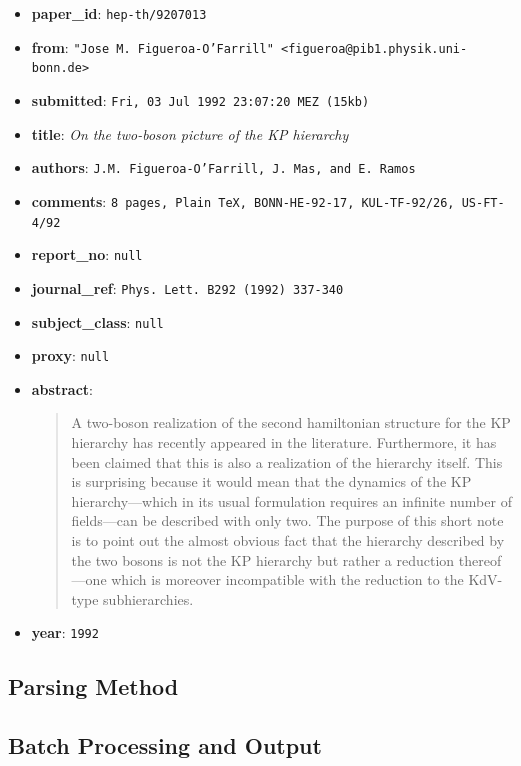 \documentclass[12pt]{article}
\begin{document}
\begin{itemize}
  \item \textbf{paper\_id}: \texttt{hep-th/9207013}
  \item \textbf{from}: \texttt{"Jose M. Figueroa-O'Farrill" <figueroa@pib1.physik.uni-bonn.de>}
  \item \textbf{submitted}: \texttt{Fri, 03 Jul 1992 23:07:20 MEZ (15kb)}
  \item \textbf{title}: \textit{On the two-boson picture of the KP hierarchy}
  \item \textbf{authors}: \texttt{J.M. Figueroa-O'Farrill, J. Mas, and E. Ramos}
  \item \textbf{comments}: \texttt{8 pages, Plain TeX, BONN-HE-92-17, KUL-TF-92/26, US-FT-4/92}
  \item \textbf{report\_no}: \texttt{null}
  \item \textbf{journal\_ref}: \texttt{Phys. Lett. B292 (1992) 337-340}
  \item \textbf{subject\_class}: \texttt{null}
  \item \textbf{proxy}: \texttt{null}
  \item \textbf{abstract}: \smallskip

  \begin{quote}
    A two-boson realization of the second hamiltonian structure for the KP hierarchy has recently appeared in the literature. Furthermore, it has been claimed that this is also a realization of the hierarchy itself. This is surprising because it would mean that the dynamics of the KP hierarchy---which in its usual formulation requires an infinite number of fields---can be described with only two. The purpose of this short note is to point out the almost obvious fact that the hierarchy described by the two bosons is not the KP hierarchy but rather a reduction thereof---one which is moreover incompatible with the reduction to the KdV-type subhierarchies.
  \end{quote}

  \item \textbf{year}: \texttt{1992}
\end{itemize}

\subsection{Parsing Method}



\subsection{Batch Processing and Output}
\end{document}

